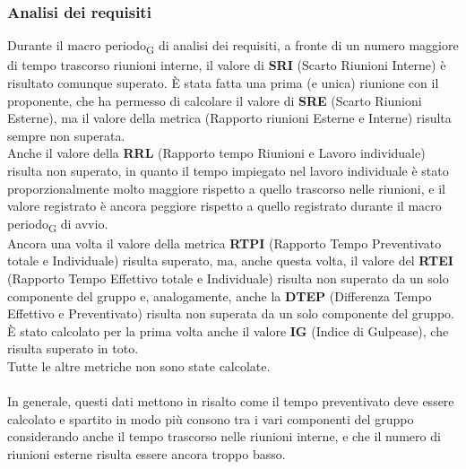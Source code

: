 \subsubsection{Analisi dei requisiti}
Durante il macro periodo\textsubscript{G} di analisi dei requisiti, a fronte di un numero maggiore di tempo trascorso riunioni interne, il valore di \textbf{SRI} (Scarto Riunioni Interne) è risultato comunque superato. È stata fatta una prima (e unica) riunione con il proponente, che ha permesso di calcolare il valore di \textbf{SRE} (Scarto Riunioni Esterne), ma il valore della metrica (Rapporto riunioni Esterne e Interne) risulta sempre non superata.\\
Anche il valore della \textbf{RRL} (Rapporto tempo Riunioni e Lavoro individuale) risulta non superato, in quanto il tempo impiegato nel lavoro individuale è stato proporzionalmente molto maggiore rispetto a quello trascorso nelle riunioni, e il valore registrato è ancora peggiore rispetto a quello registrato durante il macro periodo\textsubscript{G} di avvio. \\
Ancora una volta il valore della metrica \textbf{RTPI} (Rapporto Tempo Preventivato totale e Individuale) risulta superato, ma, anche questa volta, il valore del \textbf{RTEI} (Rapporto Tempo Effettivo totale e Individuale) risulta non superato da un solo componente del gruppo e, analogamente, anche la \textbf{DTEP} (Differenza Tempo Effettivo e Preventivato) risulta non superata da un solo componente del gruppo. \\
È stato calcolato per la prima volta anche il valore \textbf{IG} (Indice di Gulpease), che risulta superato in toto.\\
Tutte le altre metriche non sono state calcolate.\\\\
In generale, questi dati mettono in risalto come il tempo preventivato deve essere calcolato e spartito in modo più consono tra i vari componenti del gruppo considerando anche il tempo trascorso nelle riunioni interne, e che il numero di riunioni esterne risulta essere ancora troppo basso.

